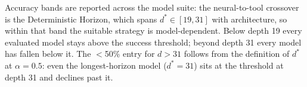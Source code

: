 \documentclass{article}
\theoremstyle{plain}
\theoremstyle{definition}
\theoremstyle{remark}
\begin{document}
Accuracy bands are reported across the model suite: the neural-to-tool crossover is the Deterministic Horizon, which spans $d^* \in [19,31]$ with architecture, so within that band the suitable strategy is model-dependent. Below depth 19 every evaluated model stays above the success threshold; beyond depth 31 every model has fallen below it. The $<$50\% entry for $d > 31$ follows from the definition of $d^*$ at $\alpha = 0.5$: even the longest-horizon model ($d^* = 31$) sits at the threshold at depth 31 and declines past it.
\end{document}
